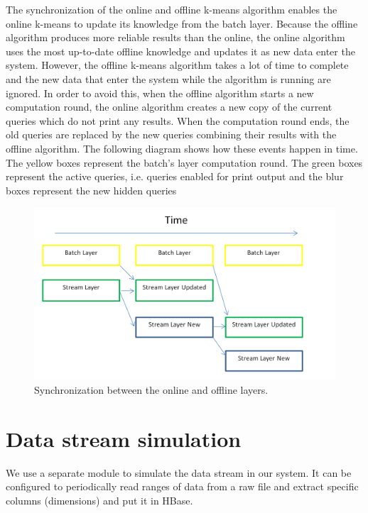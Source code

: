 \documentclass{lmproj}
\begin{document}
The synchronization of the online and offline k-means algorithm enables the online k-means to update its knowledge from the batch layer. Because the offline algorithm produces more reliable results than the online, the online algorithm uses the most up-to-date offline knowledge and updates it as new data enter the system. However, the offline k-means algorithm takes a lot of time to complete and the new data that enter the system while the algorithm is running are ignored. In order to avoid this, when the offline algorithm starts a new computation round, the online algorithm creates a new copy of the current queries which do not print any results. When the computation round ends, the old queries are replaced by the new queries combining their results with the offline algorithm. The following diagram shows how these events happen in time. The yellow boxes represent the batch’s layer computation round. The green boxes represent the active queries, i.e. queries enabled for print output and the blur boxes represent the new hidden queries 

\begin{figure}[H]
	\centering	
	\includegraphics[scale=0.4]{synchronization}
	\caption{Synchronization between the online and offline layers.}
\end{figure}

\section{Data stream simulation}
\label{systemdescr}
We use a separate module to simulate the data stream in our system. It can be configured to periodically read ranges of data from a raw file and extract specific columns (dimensions) and put it in HBase. 
\end{document}
